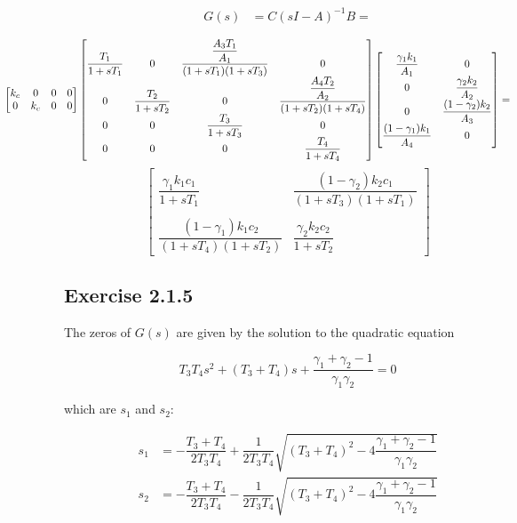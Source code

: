 \begin{align*}
  G(s) &= C (sI - A)^{-1} B = \\
\end{align*}
\[
\hspace*{-2cm}
\begin{bmatrix}
  k_c & 0 & 0 & 0 \\
  0 & k_c & 0 & 0 \\
\end{bmatrix}
\begin{bmatrix}
  \dfrac{T_1}{1 + s T_1} & 0 & \dfrac{\dfrac{A_3 T_1}{A_1}}{(1 + s T_1)(1 + s T_3)} & 0 \\
  0 & \dfrac{T_2}{1 + s T_2} & 0 & \dfrac{\dfrac{A_4 T_2}{A_2}}{(1+s T_2)(1 + s T_4)} \\
  0 & 0 & \dfrac{T_3}{1 + s T_3} & 0 \\
  0 & 0 & 0 & \dfrac{T_4}{1 + s T_4}
\end{bmatrix}
\begin{bmatrix}
  \dfrac{\gamma_1 k_1}{A_1} & 0 \\
  0 & \dfrac{\gamma_2 k_2}{A_2} \\
  0 & \dfrac{(1-\gamma_2) k_2}{A_3} \\
  \dfrac{(1-\gamma_1) k_1}{A_4} & 0
\end{bmatrix} =
\]
\[
\begin{bmatrix}
  \dfrac{\gamma_1 k_1 c_1}{1 + s T_1} & \dfrac{(1-\gamma_2)k_2 c_1}{(1 + s T_3)(1 + s T_1)} \\\\
  \dfrac{(1-\gamma_1) k_1 c_2}{(1 + s T_4)(1 + s T_2)} & \dfrac{\gamma_2 k_2 c_2}{1 + s T_2}
\end{bmatrix}
\]



\subsection*{Exercise 2.1.5}

The zeros of $G(s)$ are given by the solution to the quadratic equation

\begin{equation*}
  T_3 T_4 s^2 + (T_3 + T_4) s + \dfrac{\gamma_1 + \gamma_2 - 1}{\gamma_1 \gamma_2} = 0
\end{equation*}

which are $s_1$ and $s_2$:

\begin{align*}
  s_1 &= -\dfrac{T_3 + T_4}{2 T_3 T_4} + \dfrac{1}{2 T_3 T_4} \sqrt{(T_3 + T_4)^2 - 4 \dfrac{\gamma_1 + \gamma_2 - 1}{\gamma_1 \gamma_2}} \\
  s_2 &= -\dfrac{T_3 + T_4}{2 T_3 T_4} - \dfrac{1}{2 T_3 T_4} \sqrt{(T_3 + T_4)^2 - 4 \dfrac{\gamma_1 + \gamma_2 - 1}{\gamma_1 \gamma_2}} \\
\end{align*}


